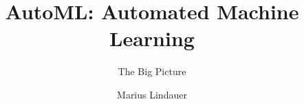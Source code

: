 




\title[AutoML: Big Picture]{AutoML: Automated Machine Learning}
\subtitle{The Big Picture}
\author{Marius Lindauer}
\date{}





	
	\maketitle
	



